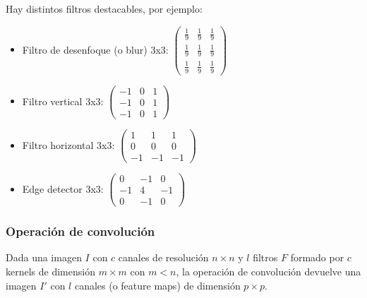 \documentclass{article}
\begin{document}
Hay distintos filtros destacables, por ejemplo:
\begin{itemize}
\item Filtro de desenfoque (o blur) 3x3: $\begin{pmatrix}
\frac{1}{9} & \frac{1}{9} & \frac{1}{9}\\
\frac{1}{9} & \frac{1}{9} & \frac{1}{9}\\
\frac{1}{9} & \frac{1}{9} & \frac{1}{9}
\end{pmatrix}$

\item Filtro vertical 3x3: $\begin{pmatrix}
-1 & 0 & 1\\
-1 & 0 & 1\\
-1 & 0 & 1
\end{pmatrix}$

\item Filtro horizontal 3x3: $\begin{pmatrix}
1 & 1 & 1\\
0 & 0 & 0\\
-1 & -1 & -1
\end{pmatrix}$

\item Edge detector 3x3: $\begin{pmatrix}
0 & -1 & 0\\
-1 & 4 & -1\\
0 & -1 & 0
\end{pmatrix}$


\end{itemize}




\subsubsection{Operación de convolución}
Dada una imagen $I$ con $c$ canales de resolución $n\times n$ y $l$ filtros $F$ formado por $c$ kernels de dimensión $m\times m$ con $m<n$, la operación de convolución devuelve una imagen $I'$ con $l$ canales (o feature maps) de dimensión $p\times p$.\\
\end{document}
